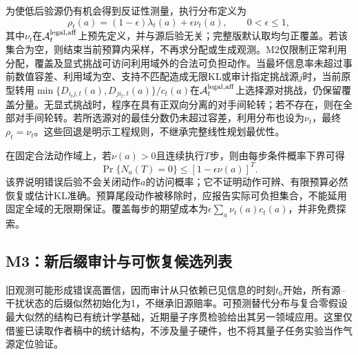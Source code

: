 为使低后验源仍有机会得到反证性测量，执行分布定义为
\begin{equation}
\rho_t(a)=(1-\epsilon)\lambda_t(a)+\epsilon\nu_t(a),
\qquad 0<\epsilon\le1,
\label{eq:m3_coverage}
\end{equation}
其中$\nu_t$在$\mathcal A_t^{\rm legal,aff}$上预先定义，并与源后验无关；完整版默认取均匀正覆盖。若该集合为空，则结束当前预算内采样，不再求分配或生成观测。M2仅限制正常利用分配，覆盖及显式挑战可访问利用域外的合法可负担动作。当最坏信息率未超过事前数值容差、利用域为空、支持不匹配造成无限KL或审计指定挑战源$j$时，当前原型转用$\min\{D_{i_tj,t}(a),D_{ji_t,t}(a)\}/c_t(a)$在$\mathcal A_t^{\rm legal,aff}$上选择源对挑战，仍保留覆盖分量。无显式挑战时，程序在具有正双向分离的对手间轮转；若不存在，则在全部对手间轮转。若所选源对的最佳分数仍未超过容差，利用分布也设为$\nu_t$，最终$\rho_t=\nu_t$。这些回退是明示工程规则，不继承完整线性规划最优性。

在固定合法动作域上，若$\nu(a)>0$且连续执行$T$步，则由每步条件概率下界可得
\begin{equation}
\Pr\{N_a(T)=0\}\le[1-\epsilon\nu(a)]^T.
\label{eq:m3_coverage_bound}
\end{equation}
该界说明错误后验不会关闭动作$a$的访问概率；它不证明动作可辨、有限预算必然恢复或估计KL准确。预算尾段动作被移除时，应报告实际可负担集合，不能延用固定全域的无限期保证。覆盖每步的期望成本为$\epsilon\sum_a\nu_t(a)c_t(a)$，并非免费探索。

\subsection{M3：新后缀审计与可恢复候选列表}

旧观测可能形成错误高置信，因而审计从只依赖已见信息的时刻$t_0$开始，所有源--干扰状态的后缀似然初始化为1，不继承旧源赔率。可预测替代分布与复合零假设最大似然的结构已有统计学基础，近期量子序贯检验给出其另一领域应用。这里仅借鉴已读取作者稿中的统计结构，不涉及量子硬件，也不将其量子任务实验当作气源定位验证。

